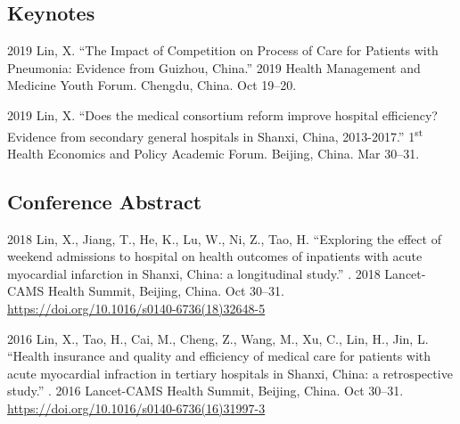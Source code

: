 \documentclass[12pt,letterpaper]{report}
\begin{document}
    \subsection*{Keynotes}

    \begin{tablist}
    
    	 \item[2019] \tab Lin, X. \enquote{The Impact of Competition on Process of Care for Patients with Pneumonia: Evidence from Guizhou, China.}  2019 Health Management and Medicine Youth Forum. Chengdu, China. Oct 19--20.
		        
        \item[2019] \tab Lin, X. \enquote{Does the medical consortium reform improve hospital efficiency? Evidence from secondary general hospitals in Shanxi, China, 2013-2017.}  1\textsuperscript{st} Health Economics and Policy Academic Forum. Beijing, China. Mar 30--31.
		
    \end{tablist}
    
    
  
       \subsection*{Conference Abstract}

    \begin{tablist}
        
        \item[2018] \tab Lin, X., Jiang, T., He, K., Lu, W., Ni, Z., Tao, H. \enquote{Exploring the effect of weekend admissions to hospital on health outcomes of inpatients with acute myocardial infarction in Shanxi, China: a longitudinal study.} . 2018 Lancet-CAMS Health Summit, Beijing, China. Oct 30--31. \href{https://doi.org/10.1016/s0140-6736(18)32648-5}{https://doi.org/10.1016/s0140-6736(18)32648-5}

        
		\item[2016] \tab Lin, X., Tao, H., Cai, M., Cheng, Z., Wang, M., Xu, C., Lin, H., Jin, L. \enquote{Health insurance and quality and efficiency of medical care for patients with acute myocardial infraction in tertiary hospitals in Shanxi, China: a retrospective study.} . 2016 Lancet-CAMS Health Summit, Beijing, China. Oct 30--31.  \href{https://doi.org/10.1016/s0140-6736(16)31997-3}{https://doi.org/10.1016/s0140-6736(16)31997-3 }            
  
    \end{tablist}
    
\end{document}
